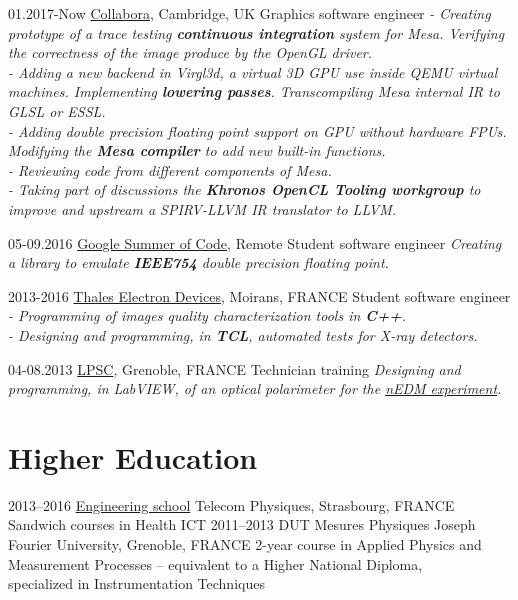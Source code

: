 \documentclass[]{Elie-cv}
\begin{document}
\begin{entrylist}
  \entry
    {01.2017-Now}
    {\href{https://www.collabora.com/}{Collabora}, Cambridge, UK}
    {Graphics software engineer}
    {\emph{ - Creating prototype of a trace testing \textbf{continuous integration} system for Mesa. Verifying the correctness of the image produce by the OpenGL driver. \\
    			- Adding a new backend in Virgl3d, a virtual 3D GPU use inside QEMU virtual machines. Implementing \textbf{lowering passes}. Transcompiling Mesa internal IR to GLSL or ESSL.\\
				- Adding double precision floating point support on GPU without hardware FPUs. Modifying the \textbf{Mesa compiler} to add new built-in functions.\\
				- Reviewing code from different components of Mesa.\\
				- Taking part of discussions the \textbf{Khronos OpenCL Tooling workgroup} to improve and upstream a SPIRV-LLVM IR translator to LLVM.}}

  \entry
    {05-09.2016}
    {\href{https://summerofcode.withgoogle.com/}{Google Summer of Code}, Remote}
    {Student software engineer}
    {\emph{Creating a library to emulate \textbf{IEEE754} double precision floating point.}}

  \entry
    {2013-2016}
    {\href{https://www.thalesgroup.com/en/microwave-imaging-sub-systems/radiology}{Thales Electron Devices}, Moirans, FRANCE}
    {Student software engineer}
    {\emph{ - Programming of images quality characterization tools in \textbf{C++}. \\
				- Designing and programming, in \textbf{TCL}, automated tests for X-ray detectors.}}

   \entry
    {04-08.2013}
    {\href{http://lpsc.in2p3.fr/index.php/en/}{LPSC}, Grenoble, FRANCE}
    {Technician training}
    {\emph{Designing and programming, in LabVIEW, of an optical polarimeter for the {\href{http://nedm.web.psi.ch/}{nEDM experiment}}.}}

\end{entrylist}

\section{Higher Education}

\begin{entrylist}
  \entry
    {2013–2016}
    {\href{http://www.telecom-physique.fr}{Engineering school}}
    {Telecom Physiques, Strasbourg, FRANCE}
    {Sandwich courses in Health ICT}
  \entry
    {2011–2013}
    {DUT Mesures Physiques}
    {Joseph Fourier University, Grenoble, FRANCE}
    {2-year course in Applied Physics and Measurement Processes – equivalent to a Higher National Diploma,\\
    			specialized in Instrumentation Techniques}
\end{entrylist}
\end{document}
